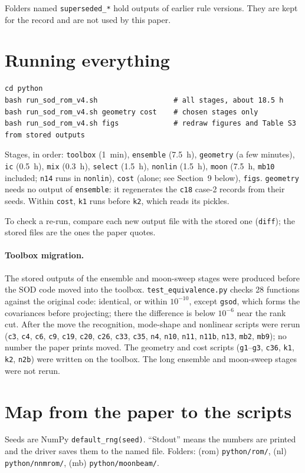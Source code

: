 \documentclass[10pt]{article}
\newcommand{\f}[1]{\texttt{#1}}
\begin{document}
Folders named \f{superseded\_\allowbreak{}*} hold outputs of earlier rule versions. They are kept for the record and are not used by this paper.

\section{Running everything}
\begin{verbatim}
cd python
bash run_sod_rom_v4.sh                  # all stages, about 18.5 h
bash run_sod_rom_v4.sh geometry cost    # chosen stages only
bash run_sod_rom_v4.sh figs             # redraw figures and Table S3 from stored outputs
\end{verbatim}
Stages, in order: \f{toolbox} (1~min), \f{ensemble} (7.5~h), \f{geometry} (a few minutes), \f{ic} (0.5~h), \f{mix} (0.3~h), \f{select} (1.5~h), \f{nonlin} (1.5~h), \f{moon} (7.5~h, \f{mb10} included; \f{n14} runs in \f{nonlin}), \f{cost} (alone; see Section~9 below), \f{figs}.
\f{geometry} needs no output of \f{ensemble}: it regenerates the \f{c18} case-2 records from their seeds.
Within \f{cost}, \f{k1} runs before \f{k2}, which reads its pickles.

To check a re-run, compare each new output file with the stored one (\f{diff}); the stored files are the ones the paper quotes.

\paragraph{Toolbox migration.} The stored outputs of the ensemble and moon-sweep stages were produced before the SOD code moved into the toolbox. \f{test\_\allowbreak{}equivalence.py} checks 28 functions against the original code: identical, or within $10^{-10}$, except \f{gsod}, which forms the covariances before projecting; there the difference is below $10^{-6}$ near the rank cut. After the move the recognition, mode-shape and nonlinear scripts were rerun (\f{c3}, \f{c4}, \f{c6}, \f{c9}, \f{c19}, \f{c20}, \f{c26}, \f{c33}, \f{c35}, \f{n4}, \f{n10}, \f{n11}, \f{n11b}, \f{n13}, \f{mb2}, \f{mb9}); no number the paper prints moved. The geometry and cost scripts (\f{g1}--\f{g3}, \f{c36}, \f{k1}, \f{k2}, \f{n2b}) were written on the toolbox. The long ensemble and moon-sweep stages were not rerun.

\section{Map from the paper to the scripts}\label{sec:map}
Seeds are NumPy \f{default\_\allowbreak{}rng(seed)}. ``Stdout'' means the numbers are printed and the driver saves them to the named file. Folders: (rom) \f{python/\allowbreak{}rom/\allowbreak{}}, (nl) \f{python/\allowbreak{}nnmrom/\allowbreak{}}, (mb) \f{python/\allowbreak{}moonbeam/\allowbreak{}}.
\end{document}
